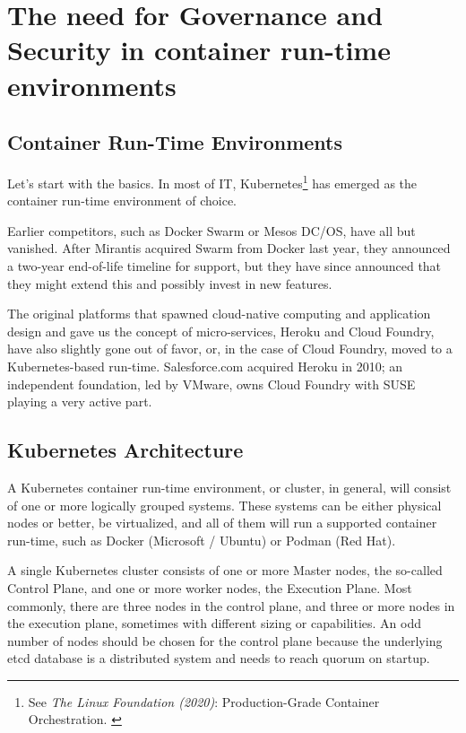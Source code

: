 %
%

\pagebreak
\section{The need for Governance and Security in container run-time environments}

\onehalfspacing

\subsection{Container Run-Time Environments}

Let's start with the basics. In most of IT, Kubernetes\footnote{See \textit{The Linux Foundation (2020)}: Production-Grade Container Orchestration. \cite{kubernetes}} has emerged as the container run-time environment of choice.

Earlier competitors, such as Docker Swarm or Mesos DC/OS, have all but vanished. After Mirantis acquired Swarm from Docker last year, they announced a two-year end-of-life timeline for support, but they have since announced that they might extend this and possibly invest in new features.

The original platforms that spawned cloud-native computing and application design and gave us the concept of micro-services, Heroku and Cloud Foundry, have also slightly gone out of favor, or, in the case of Cloud Foundry, moved to a Kubernetes-based run-time. Salesforce.com acquired Heroku in 2010; an independent foundation, led by VMware, owns Cloud Foundry with SUSE playing a very active part.

\subsection{Kubernetes Architecture}

A Kubernetes container run-time environment, or cluster, in general, will consist of one or more logically grouped systems. These systems can be either physical nodes or better, be virtualized, and all of them will run a supported container run-time, such as Docker (Microsoft / Ubuntu) or Podman (Red Hat).

A single Kubernetes cluster consists of one or more Master nodes, the so-called Control Plane, and one or more worker nodes, the Execution Plane. Most commonly, there are three nodes in the control plane, and three or more nodes in the execution plane, sometimes with different sizing or capabilities. An odd number of nodes should be chosen for the control plane because the underlying etcd database is a distributed system and needs to reach quorum on startup.

